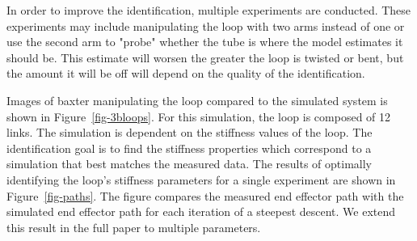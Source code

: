 \documentclass[runningheads,a4paper]{llncs}
\begin{document}
In order to improve the identification, multiple experiments are conducted.  These experiments may include manipulating the loop with two arms instead of one or use the second arm to "probe" whether the tube is where the model estimates it should be.  This estimate will worsen the greater the loop is twisted or bent, but the amount it will be off will depend on the quality of the identification.

Images of baxter manipulating the loop compared to the simulated system is shown in Figure~\ref{fig-3bloops}.  For this simulation, the loop is composed of 12 links.  The simulation is dependent on the stiffness values of the loop.  The identification goal is to find the stiffness properties which correspond to a simulation that best matches the measured data.  The results of optimally identifying the loop's stiffness parameters for a single experiment are shown in Figure~\ref{fig-paths}.  The figure compares the measured end effector path with the simulated end effector path for each iteration of a steepest descent.  We extend this result in the full paper to multiple parameters.




\end{document}
